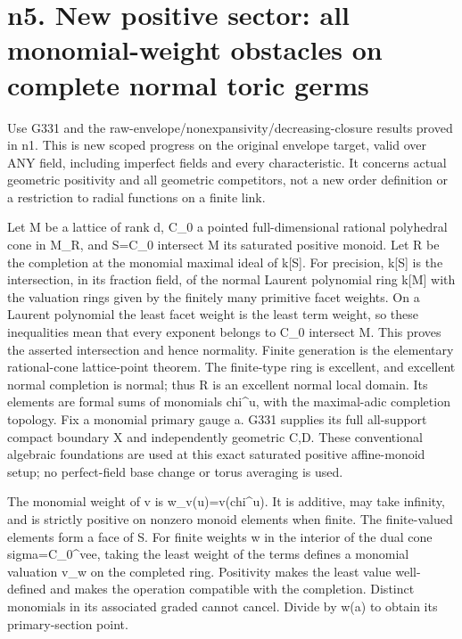 \documentclass[11pt]{article}
\begin{document}
\section{n5. New positive sector: all monomial-weight obstacles on complete normal toric germs}

Use G331 and the raw-envelope/nonexpansivity/decreasing-closure results proved in n1. This is new scoped progress on the original envelope target, valid over ANY field, including imperfect fields and every characteristic. It concerns actual geometric positivity and all geometric competitors, not a new order definition or a restriction to radial functions on a finite link.

Let M be a lattice of rank d, C\_0 a pointed full-dimensional rational polyhedral cone in M\_R, and S=C\_0 intersect M its saturated positive monoid. Let R be the completion at the monomial maximal ideal of k[S]. For precision, k[S] is the intersection, in its fraction field, of the normal Laurent polynomial ring k[M] with the valuation rings given by the finitely many primitive facet weights. On a Laurent polynomial the least facet weight is the least term weight, so these inequalities mean that every exponent belongs to C\_0 intersect M. This proves the asserted intersection and hence normality. Finite generation is the elementary rational-cone lattice-point theorem. The finite-type ring is excellent, and excellent normal completion is normal; thus R is an excellent normal local domain. Its elements are formal sums of monomials chi\textasciicircum{}u, with the maximal-adic completion topology. Fix a monomial primary gauge a. G331 supplies its full all-support compact boundary X and independently geometric C,D. These conventional algebraic foundations are used at this exact saturated positive affine-monoid setup; no perfect-field base change or torus averaging is used.

The monomial weight of v is w\_v(u)=v(chi\textasciicircum{}u). It is additive, may take infinity, and is strictly positive on nonzero monoid elements when finite. The finite-valued elements form a face of S. For finite weights w in the interior of the dual cone sigma=C\_0\textasciicircum{}vee, taking the least weight of the terms defines a monomial valuation v\_w on the completed ring. Positivity makes the least value well-defined and makes the operation compatible with the completion. Distinct monomials in its associated graded cannot cancel. Divide by w(a) to obtain its primary-section point.
\end{document}
